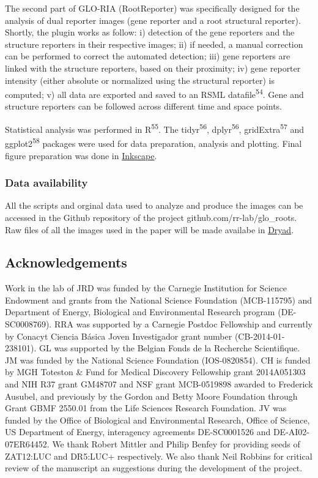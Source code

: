 \documentclass[]{article}
\begin{document}
The second part of GLO-RIA (RootReporter) was specifically designed for
the analysis of dual reporter images (gene reporter and a root
structural reporter). Shortly, the plugin works as follow: i) detection
of the gene reporters and the structure reporters in their respective
images; ii) if needed, a manual correction can be performed to correct
the automated detection; iii) gene reporters are linked with the
structure reporters, based on their proximity; iv) gene reporter
intensity (either absolute or normalized using the structural reporter)
is computed; v) all data are exported and saved to an RSML
datafile\textsuperscript{54}. Gene and structure reporters can be
followed across different time and space points.

Statistical analysis was performed in R\textsuperscript{55}. The
tidyr\textsuperscript{56}, dplyr\textsuperscript{56},
gridExtra\textsuperscript{57} and ggplot2\textsuperscript{58} packages
were used for data preparation, analysis and plotting. Final figure
preparation was done in \href{https://inkscape.org/en/}{Inkscape}.

\subsubsection{Data availability}\label{data-availability}

All the scripts and orginal data used to analyze and produce the images
can be accessed in the Github repository of the project
github.com/rr-lab/glo\_roots. Raw files of all the images used in the
paper will be made availabe in \href{http://datadryad.org/}{Dryad}.

\subsection{Acknowledgements}\label{acknowledgements}

Work in the lab of JRD was funded by the Carnegie Institution for
Science Endowment and grants from the National Science Foundation
(MCB-115795) and Department of Energy, Biological and Environmental
Research program (DE-SC0008769). RRA was supported by a Carnegie Postdoc
Fellowship and currently by Conacyt Ciencia Básica Joven Investigador
grant number (CB-2014-01-238101). GL was supported by the Belgian Fonds
de la Recherche Scientifique. JM was funded by the National Science
Foundation (IOS-0820854). CH is funded by MGH Toteston \& Fund for
Medical Discovery Fellowship grant 2014A051303 and NIH R37 grant GM48707
and NSF grant MCB-0519898 awarded to Frederick Ausubel, and previously
by the Gordon and Betty Moore Foundation through Grant GBMF 2550.01 from
the Life Sciences Research Foundation. JV was funded by the Office of
Biological and Environmental Research, Office of Science, US Department
of Energy, interagency agreements DE-SC0001526 and DE-AI02-07ER64452. We
thank Robert Mittler and Philip Benfey for providing seeds of ZAT12:LUC
and DR5:LUC+ respectively. We also thank Neil Robbins for critical
review of the manuscript an suggestions during the development of the
project.
\end{document}
